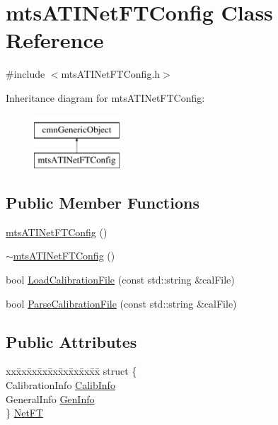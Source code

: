 \hypertarget{classmts_a_t_i_net_f_t_config}{}\section{mts\+A\+T\+I\+Net\+F\+T\+Config Class Reference}
\label{classmts_a_t_i_net_f_t_config}


{\ttfamily \#include $<$mts\+A\+T\+I\+Net\+F\+T\+Config.\+h$>$}

Inheritance diagram for mts\+A\+T\+I\+Net\+F\+T\+Config\+:\begin{figure}[H]
\begin{center}
\leavevmode
\includegraphics[height=2.000000cm]{de/d7d/classmts_a_t_i_net_f_t_config}
\end{center}
\end{figure}
\subsection*{Public Member Functions}
\begin{DoxyCompactItemize}
\item 
\hyperlink{classmts_a_t_i_net_f_t_config_acde645f416f4db3de15efb0e01a6b088}{mts\+A\+T\+I\+Net\+F\+T\+Config} ()
\item 
\hyperlink{classmts_a_t_i_net_f_t_config_a3c3c637e2eb6fffeffb83b0bdc3cf5b6}{$\sim$mts\+A\+T\+I\+Net\+F\+T\+Config} ()
\item 
bool \hyperlink{classmts_a_t_i_net_f_t_config_acdb1e00147a03abf4453f9e7c4ab3835}{Load\+Calibration\+File} (const std\+::string \&cal\+File)
\item 
bool \hyperlink{classmts_a_t_i_net_f_t_config_a1c6b1f80185f59b081d6266e0f5d7714}{Parse\+Calibration\+File} (const std\+::string \&cal\+File)
\end{DoxyCompactItemize}
\subsection*{Public Attributes}
\begin{DoxyCompactItemize}
\item 
\begin{tabbing}
xx\=xx\=xx\=xx\=xx\=xx\=xx\=xx\=xx\=\kill
struct \{\\
\>CalibrationInfo \hyperlink{classmts_a_t_i_net_f_t_config_a8a79d092fb24d610b055aca16680e749}{CalibInfo}\\
\>GeneralInfo \hyperlink{classmts_a_t_i_net_f_t_config_a683259eee30c2156fe2e46bb34caa4eb}{GenInfo}\\
\} \hyperlink{classmts_a_t_i_net_f_t_config_a4c66b740b9f14f25d9b0829dfd31b3c4}{NetFT}\\

\end{tabbing}\end{DoxyCompactItemize}
